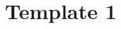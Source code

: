 \documentclass[../main.tex]{subfiles}
\begin{document}
\section{Template 1}

\lipsum[1]

\solution
\end{document}
